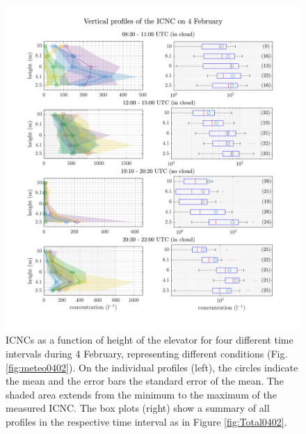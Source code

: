 \documentclass[draft,linenumbers]{agujournal}
\begin{document}
\begin{figure}[t]
 \centering
 	\includegraphics[width=14cm]{0402_Overview.png}
 \caption{ICNCs as a function of height of the elevator for four different time intervals during 4 February, representing different conditions (Fig. \ref{fig:meteo0402}). On the individual profiles (left), the circles indicate the mean and the error bars the standard error of the mean. The shaded area extends from the minimum to the maximum of the measured ICNC. The box plots (right) show a summary of all profiles in the respective time interval as in Figure \ref{fig:Total0402}.}
 \label{fig:profiles0402}
\end{figure}
\end{document}
